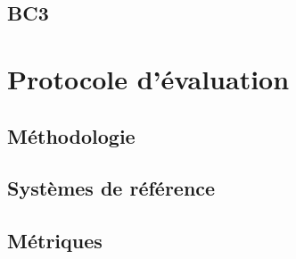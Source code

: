 \subsection{BC3}


\section{Protocole d'évaluation}


\subsection{Méthodologie}


\subsection{Systèmes de référence}


\subsection{Métriques}

